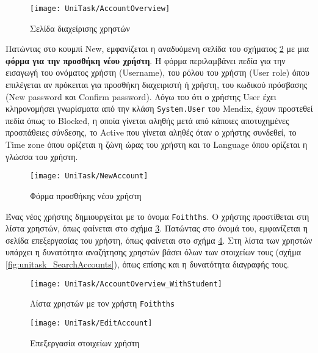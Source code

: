        \begin{figure}[h!] \noindent \centering
            \texttt{[image: UniTask/AccountOverview]}
            \caption{\centering Σελίδα διαχείρισης χρηστών}
            \label{fig:unitask_AccountOverview}
        \end{figure}

        Πατώντας στο κουμπί {\Zona New}, εμφανίζεται η αναδυόμενη σελίδα του σχήματος \ref{fig:unitask_NewAccount} με μια \textbf{φόρμα για την προσθήκη νέου χρήστη}. Η φόρμα περιλαμβάνει πεδία για την εισαγωγή του ονόματος χρήστη ({\Zona Username}), του ρόλου του χρήστη ({\Zona User role}) όπου επιλέγεται αν πρόκειται για προσθήκη διαχειριστή ή χρήστη, του κωδικού πρόσβασης ({\Zona New password} και {\Zona Confirm password}). Λόγω του ότι ο χρήστης User έχει κληρονομήσει γνωρίσματα από την κλάση \texttt{System.User} του Mendix, έχουν προστεθεί πεδία όπως το {\Zona Blocked}, η οποία γίνεται αληθής μετά από κάποιες αποτυχημένες προσπάθειες σύνδεσης, το {\Zona Active} που γίνεται αληθές όταν ο χρήστης συνδεθεί, το {\Zona Time zone} όπου ορίζεται η ζώνη ώρας του χρήστη και το {\Zona Language} όπου ορίζεται η γλώσσα του χρήστη.

        \begin{figure}[h!] \noindent \centering
            \texttt{[image: UniTask/NewAccount]}
            \caption{\centering Φόρμα προσθήκης νέου χρήστη}
            \label{fig:unitask_NewAccount}
        \end{figure}

        Ένας νέος χρήστης δημιουργείται με το όνομα \texttt{Foithths}. Ο χρήστης προστίθεται στη λίστα χρηστών, όπως φαίνεται στο σχήμα \ref{fig:unitask_AccountOverview_WithStudent}. Πατώντας στο όνομά του, εμφανίζεται η σελίδα επεξεργασίας του χρήστη, όπως φαίνεται στο σχήμα \ref{fig:unitask_EditAccount}. Στη λίστα των χρηστών υπάρχει η δυνατότητα αναζήτησης χρηστών βάσει όλων των στοιχείων τους (σχήμα \ref{fig:unitask_SearchAccounts}), όπως επίσης και η δυνατότητα διαγραφής τους.

        \begin{figure}[h!] \noindent \centering
            \texttt{[image: UniTask/AccountOverview\_WithStudent]}
            \caption{\centering Λίστα χρηστών με τον χρήστη \texttt{Foithths}}
            \label{fig:unitask_AccountOverview_WithStudent}
        \end{figure}

        \begin{figure}[h!] \noindent \centering
            \texttt{[image: UniTask/EditAccount]}
            \caption{\centering Επεξεργασία στοιχείων χρήστη}
            \label{fig:unitask_EditAccount}
        \end{figure}

